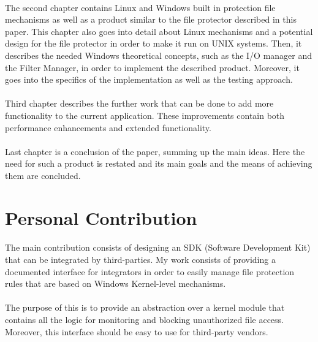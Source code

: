 	\paragraph{}
	The second chapter contains Linux and Windows built in protection file mechanisms as well as a product similar to the file protector described in this paper. This chapter also goes into detail about Linux mechanisms and a potential design for the file protector in order to make it run on UNIX systems. Then, it describes the needed Windows theoretical concepts, such as the I/O manager and the Filter Manager, in order to implement the described product. Moreover, it goes into the specifics of the implementation as well as the testing approach. 
	
	\paragraph{}
	Third chapter describes the further work that can be done to add more functionality to the current application. These improvements contain both performance enhancements and extended functionality.  
	
	\paragraph{}
	Last chapter is a conclusion of the paper, summing up the main ideas. Here the need for such a product is restated and its main goals and the means of achieving them are concluded.
		
	\section{Personal Contribution}
	\paragraph{}
	The main contribution consists of designing an SDK (Software Development Kit) that can be integrated by third-parties. My work consists of providing a documented interface for integrators in order to easily manage file protection rules that are based on Windows Kernel-level mechanisms.
	
	\paragraph{}
	The purpose of this is to provide an abstraction over a kernel module that contains all the logic for monitoring and blocking unauthorized file access. Moreover, this interface should be easy to use for third-party vendors.
	
	
